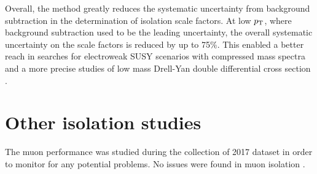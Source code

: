 Overall, the method greatly reduces the systematic uncertainty from
background subtraction in the determination of isolation scale factors.
At low $p_{\text{T}}$, where background subtraction used to be the leading
uncertainty, the overall systematic uncertainty on the scale factors
is reduced by up to 75\%. This enabled a better reach in searches for
electroweak SUSY scenarios with compressed mass spectra
\cite{PhysRevD.97.052010} and a more precise studies of low mass
Drell-Yan double differential cross section \cite{Giuli:2681125}.

\section{Other isolation studies}

The muon performance was studied during the collection of 2017 dataset
in order to monitor for any potential problems. No issues were 
found in muon isolation \cite{Bellomo:2282672}.

